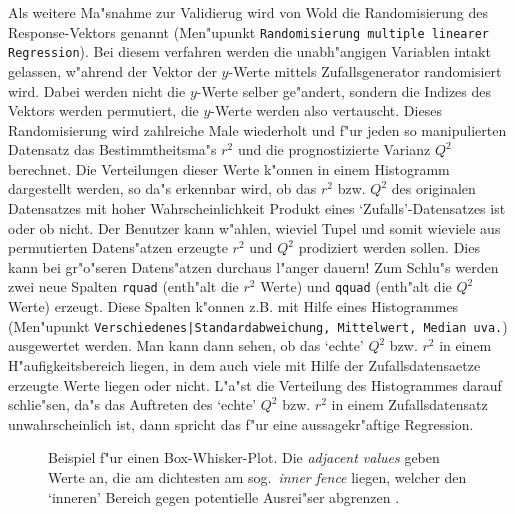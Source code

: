 \documentclass[a4paper,11pt]{article}
\begin{document}
\begin{itemize}
  Als weitere Ma"snahme zur Validierug wird von {\sc Wold} die
  Randomisierung des Response-Vektors genannt (Men"upunkt
  {\tt Randomisierung multiple linearer Regression}). Bei diesem
  verfahren werden die unabh"angigen Variablen intakt gelassen, w"ahrend
  der Vektor der $y$-Werte mittels Zufallsgenerator randomisiert wird.
  Dabei werden nicht die $y$-Werte selber ge"andert, sondern die
  Indizes des Vektors werden permutiert, die $y$-Werte werden also
  vertauscht. Dieses Randomisierung wird zahlreiche Male wiederholt
  und f"ur jeden so manipulierten Datensatz das Bestimmtheitsma"s $r^2$
  und die prognostizierte Varianz $Q^2$ berechnet. Die Verteilungen
  dieser Werte k"onnen in einem Histogramm dargestellt werden, so da"s
  erkennbar wird, ob das $r^2$ bzw. $Q^2$ des originalen Datensatzes
  mit hoher Wahrscheinlichkeit Produkt eines `Zufalls'-Datensatzes ist
  oder ob nicht. Der Benutzer kann w"ahlen, wieviel Tupel und somit
  wieviele aus permutierten Datens"atzen erzeugte $r^2$ und $Q^2$
  prodiziert werden sollen. Dies kann bei gr"o"seren Datens"atzen
  durchaus l"anger dauern! Zum Schlu"s werden zwei neue Spalten
  \verb|rquad| (enth"alt die $r^2$ Werte) und \verb|qquad| (enth"alt
  die $Q^2$ Werte) erzeugt. Diese Spalten k"onnen z.B. mit Hilfe eines
  Histogrammes (Men"upunkt {\tt Verschiedenes|Standardabweichung,
  Mittelwert, Median uva.}) ausgewertet werden. Man kann dann sehen,
  ob das `echte' $Q^2$ bzw. $r^2$ in einem H"aufigkeitsbereich liegen,
  in dem auch viele mit Hilfe der Zufallsdatensaetze erzeugte Werte
  liegen oder nicht. L"a"st die Verteilung des Histogrammes darauf
  schlie"sen, da"s das Auftreten des `echte' $Q^2$ bzw. $r^2$  in einem
  Zufallsdatensatz unwahrscheinlich ist, dann spricht das f"ur eine
  aussagekr"aftige Regression.
  
 \end{itemize}

%
%
 
%
%
%
 



\vfill

\begin{figure}[htbp]
  \begin{center}
    \leavevmode
    \centerline{}
%    
%     
  \caption[]{\fsize Beispiel f"ur einen Box-Whisker-Plot. Die
    {\em adjacent values} geben Werte an, die am dichtesten am sog.\ 
    {\em inner fence} liegen, welcher den `inneren' Bereich gegen
    potentielle Ausrei"ser abgrenzen \cite[S. 835]{hartung86}.}
  \label{fig:boxplot}
  \end{center}
\end{figure}
\end{document}

